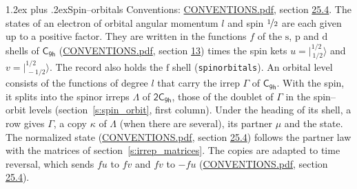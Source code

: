 \documentclass[10pt,a4paper]{article}
\makeatletter
\renewcommand\section{\@startsection{section}{1}{\z@}{-3ex plus -1ex minus -.2ex}%
  {1.2ex plus .2ex}{\normalfont\large\sffamily\bfseries\color{parttitle}}}
\numberwithin{equation}{section}
\newcommand{\grp}[1]{\mathsf{#1}}
\newcommand{\orbital}[1]{\mathrm{#1}}
\newcommand{\mult}{\kappa}
\newcommand{\intx}{\mu}
\newcommand{\jm}[2]{\bigl\lvert{}^{#1}_{\,#2}\bigr\rangle}
\makeatother
\begin{document}
\section{Spin--orbitals}\label{s:spin_orbitals}
Conventions: \href{../../CONVENTIONS.pdf}{CONVENTIONS.pdf}, section \href{../../CONVENTIONS.pdf\#conv.25.4}{25.4}.
\leavevmode\label{n:index.orbital.l}The states of an electron of orbital angular momentum $l$ and spin $\nicefrac{1}{2}$ are each given up to a positive factor. \label{n:local.spinor.uv}\label{n:local.function.f}They are written in the functions $f$ of the $\orbital{s}$, $\orbital{p}$ and $\orbital{d}$ shells of \href{../../../rotation/data/pdf/C9h.pdf}{$\grp{C_{9h}}$} (\href{../../CONVENTIONS.pdf}{CONVENTIONS.pdf}, section \href{../../../rotation/CONVENTIONS.pdf\#conv.13}{13}) times the spin kets $u = \jm{1/2}{1/2}$ and $v = \jm{1/2}{-1/2}$. The record also holds the $\orbital{f}$ shell (\texttt{spinorbitals}). An orbital level consists of the functions of degree $l$ that carry the irrep $\Gamma$ of \href{../../../rotation/data/pdf/C9h.pdf}{$\grp{C_{9h}}$}. With the spin, it splits into the spinor irreps $\Lambda$ of $\grp{2C_{9h}}$, those of the doublet of $\Gamma$ in the spin--orbit levels (section~\ref{s:spin_orbit}, first column). \label{n:head.state}Under the heading of its shell, a row gives $\Gamma$, a copy $\mult$ of $\Lambda$ (when there are several), its partner $\intx$ and the state. The normalized state (\href{../../CONVENTIONS.pdf}{CONVENTIONS.pdf}, section \href{../../CONVENTIONS.pdf\#conv.25.4}{25.4}) follows the partner law with the matrices of section~\ref{s:irrep_matrices}. The copies are adapted to time reversal, which sends $f u$ to $f v$ and $f v$ to $-f u$ (\href{../../CONVENTIONS.pdf}{CONVENTIONS.pdf}, section \href{../../CONVENTIONS.pdf\#conv.25.4}{25.4}).
\end{document}
